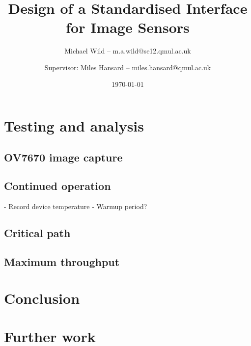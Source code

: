 \documentclass[a4paper,11pt]{report}
\title{Design of a Standardised Interface for Image Sensors}
\author{Michael Wild -- m.a.wild@se12.qmul.ac.uk \and Supervisor: Miles Hansard -- miles.hansard@qmul.ac.uk}
\date{\today}
\begin{document}
  \maketitle
  

  \tableofcontents
  \listoffigures
  \listoftables
  \lstlistoflistings

  
  
  
  
  

  \chapter{Testing and analysis}
    \section{OV7670 image capture}
    \section{Continued operation}
    - Record device temperature
    - Warmup period?
    \section{Critical path}
    \section{Maximum throughput}
  
  \chapter{Conclusion}




  \chapter{Further work}



  
  \printglossary[type=\acronymtype]
\end{document}
